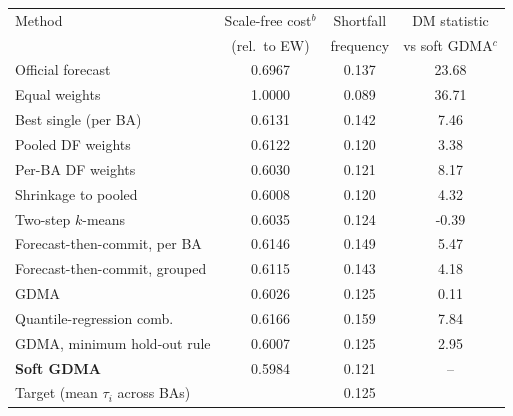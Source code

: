 \begin{tabular}{@{}lccc@{}}
\toprule
Method & Scale-free cost$^b$ & Shortfall & DM statistic \\
 & (rel.\ to EW) & frequency & vs soft GDMA$^c$ \\
\midrule
Official forecast & 0.6967 & 0.137 & 23.68 \\
Equal weights & 1.0000 & 0.089 & 36.71 \\
Best single (per BA) & 0.6131 & 0.142 & 7.46 \\
Pooled DF weights & 0.6122 & 0.120 & 3.38 \\
Per-BA DF weights & 0.6030 & 0.121 & 8.17 \\
Shrinkage to pooled & 0.6008 & 0.120 & 4.32 \\
Two-step $k$-means & 0.6035 & 0.124 & -0.39 \\
Forecast-then-commit, per BA & 0.6146 & 0.149 & 5.47 \\
Forecast-then-commit, grouped & 0.6115 & 0.143 & 4.18 \\
GDMA & 0.6026 & 0.125 & 0.11 \\
Quantile-regression comb. & 0.6166 & 0.159 & 7.84 \\
GDMA, minimum hold-out rule & 0.6007 & 0.125 & 2.95 \\
\textbf{Soft GDMA} & 0.5984 & 0.121 & -- \\
\midrule
Target (mean $\tau_i$ across BAs) & & 0.125 & \\
\bottomrule
\end{tabular}
